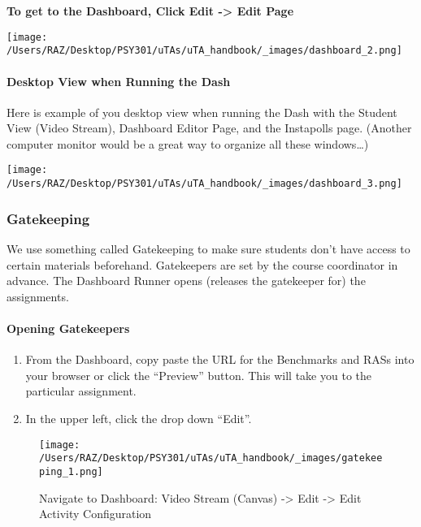 \documentclass[
]{article}
\providecommand{\tightlist}{%
  \setlength{\itemsep}{0pt}\setlength{\parskip}{0pt}}
\begin{document}
\textbf{To get to the Dashboard, Click Edit -\textgreater{} Edit Page}

\texttt{[image: /Users/RAZ/Desktop/PSY301/uTAs/uTA\_handbook/\_images/dashboard\_2.png]}

\hypertarget{desktop-view-when-running-the-dash}{%
\paragraph{Desktop View when Running the Dash}\label{desktop-view-when-running-the-dash}}

Here is example of you desktop view when running the Dash with the Student View (Video Stream), Dashboard Editor Page, and the Instapolls page. (Another computer monitor would be a great way to organize all these windows\ldots)

\texttt{[image: /Users/RAZ/Desktop/PSY301/uTAs/uTA\_handbook/\_images/dashboard\_3.png]}

\hypertarget{gatekeeping}{%
\subsubsection{Gatekeeping}\label{gatekeeping}}

We use something called Gatekeeping to make sure students don't have access to certain materials beforehand. Gatekeepers are set by the course coordinator in advance. The Dashboard Runner opens (releases the gatekeeper for) the assignments.

\hypertarget{opening-gatekeepers}{%
\paragraph{Opening Gatekeepers}\label{opening-gatekeepers}}

\begin{enumerate}
\def\labelenumi{\arabic{enumi}.}
\tightlist
\item
  From the Dashboard, copy paste the URL for the Benchmarks and RASs into your browser or click the ``Preview'' button. This will take you to the particular assignment.\\
\item
  In the upper left, click the drop down ``Edit''.
\end{enumerate}

\begin{figure}
\centering
\texttt{[image: /Users/RAZ/Desktop/PSY301/uTAs/uTA\_handbook/\_images/gatekeeping\_1.png]}
\caption{Navigate to Dashboard: Video Stream (Canvas) -\textgreater{} Edit -\textgreater{} Edit Activity Configuration}
\end{figure}
\end{document}
